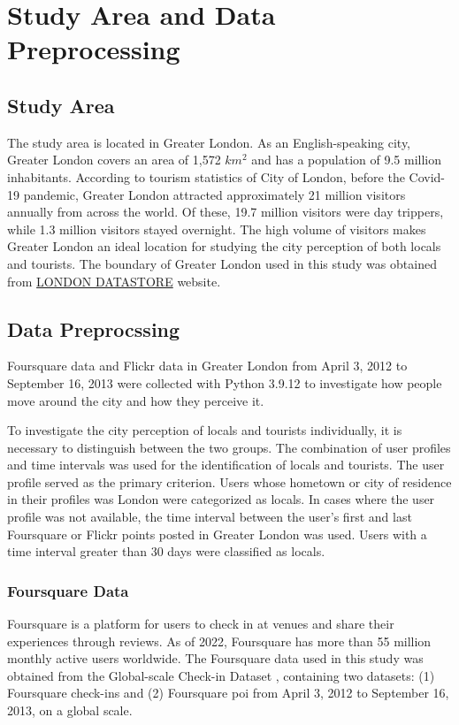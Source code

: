 \documentclass{article}
\begin{document}
\section{Study Area and Data Preprocessing}
\subsection{Study Area}
The study area is located in Greater London. As an English-speaking
city, Greater London covers an area of 1,572 \(km^2\) and has a population of 9.5 million inhabitants. According to tourism statistics of City of London, before the Covid-19 pandemic, Greater London attracted approximately 21 million visitors annually from across the world. Of these, 19.7 million visitors were day trippers, while 1.3 million visitors stayed overnight. The high volume of visitors makes Greater London an ideal location for studying the city perception of both locals and tourists. The boundary of Greater London used in this study was obtained from \href{https://data.london.gov.uk/dataset/statistical-gis-boundary-files-london}{LONDON DATASTORE} website.

\subsection{Data Preprocssing} 
Foursquare data and Flickr data in Greater London from April 3, 2012 to September 16, 2013 were collected with Python 3.9.12 to investigate how people move around the city and how they perceive it.

To investigate the city perception of locals and tourists individually, it is necessary to distinguish between the two groups. The combination of user profiles and time intervals was used for the identification of locals and tourists. The user profile served as the primary criterion. Users whose hometown or city of residence in their profiles was London were categorized as locals. In cases where the user profile was not available, the time interval between the user's first and last Foursquare or Flickr points posted in Greater London was used. Users with a time interval greater than 30 days were classified as locals.

\subsubsection{Foursquare Data}
Foursquare is a platform for users to check in at venues and share their experiences through reviews. As of 2022, Foursquare has more than 55 million monthly active users worldwide. The Foursquare data used in this study was obtained from the Global-scale Check-in Dataset \cite{yang_nationtelescope_2015}, containing two datasets: (1) Foursquare check-ins and (2) Foursquare \acrshort{poi} from April 3, 2012 to September 16, 2013, on a global scale.
\end{document}
